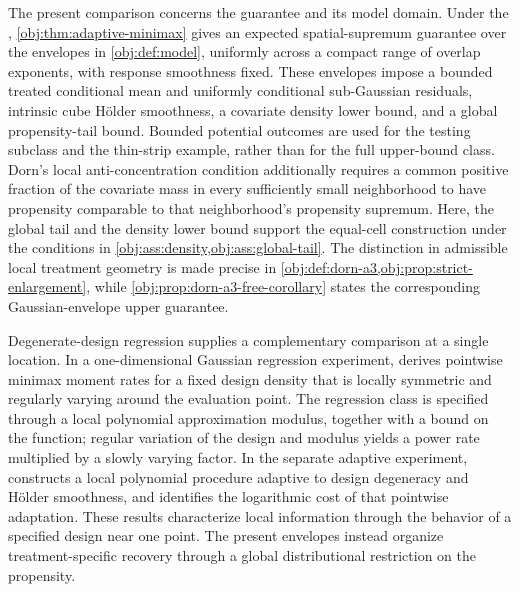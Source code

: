 \documentclass[11pt]{article}
\begin{document}
The present comparison concerns the guarantee and its model domain. Under the , \cref{obj:thm:adaptive-minimax} gives an expected spatial-supremum guarantee over the envelopes in \cref{obj:def:model}, uniformly across a compact range of overlap exponents, with response smoothness fixed. These envelopes impose a bounded treated conditional mean and uniformly conditional sub-Gaussian residuals, intrinsic cube Hölder smoothness, a covariate density lower bound, and a global propensity-tail bound. Bounded potential outcomes are used for the testing subclass and the thin-strip example, rather than for the full upper-bound class. Dorn's local anti-concentration condition additionally requires a common positive fraction of the covariate mass in every sufficiently small neighborhood to have propensity comparable to that neighborhood's propensity supremum. Here, the global tail and the density lower bound support the equal-cell construction under the conditions in \cref{obj:ass:density,obj:ass:global-tail}. The distinction in admissible local treatment geometry is made precise in \cref{obj:def:dorn-a3,obj:prop:strict-enlargement}, while \cref{obj:prop:dorn-a3-free-corollary} states the corresponding Gaussian-envelope upper guarantee.

Degenerate-design regression supplies a complementary comparison at a single location. In a one-dimensional Gaussian regression experiment, \citet[Assumption M and Theorem 1, pp. 3--4]{Gaiffas2005DegenerateRates} derives pointwise minimax moment rates for a fixed design density that is locally symmetric and regularly varying around the evaluation point. The regression class is specified through a local polynomial approximation modulus, together with a bound on the function; regular variation of the design and modulus yields a power rate multiplied by a slowly varying factor. In the separate adaptive experiment, \citet[Abstract]{Gaiffas2005AdaptiveDegenerateDesign} constructs a local polynomial procedure adaptive to design degeneracy and Hölder smoothness, and identifies the logarithmic cost of that pointwise adaptation. These results characterize local information through the behavior of a specified design near one point. The present envelopes instead organize treatment-specific recovery through a global distributional restriction on the propensity.
\end{document}
